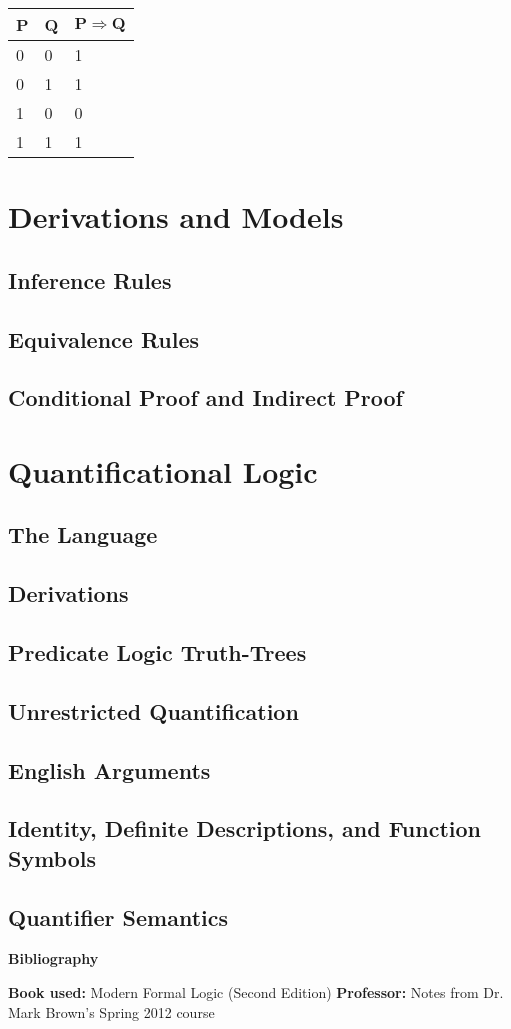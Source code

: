 \documentclass{report}
\begin{document}
\begin{itemize}
\begin{tabular}{ | l | l | p{1.25cm} |}
					\hline
					\textbf{P}& 
					\textbf{Q}&
					$\mathbf{P\Rightarrow Q}$\\
					\hline
		        	
		        	0& 
					0&
					1\\
					\hline
					
		        	0& 
					1&
					1\\
					\hline
					
		        	1& 
					0&
					0\\
					\hline
					
		        	1& 
					1&
					1\\
					\hline
				\end{tabular}
				\egroup
	\end{itemize}
\chapter{Derivations and Models}
	\section{Inference Rules}
	\section{Equivalence Rules}
	\section{Conditional Proof and Indirect Proof}
\chapter{Quantificational Logic}
	\section{The Language}
	\section{Derivations}
	\section{Predicate Logic Truth-Trees}
	\section{Unrestricted Quantification}
	\section{English Arguments}
	\section{Identity, Definite Descriptions, and Function Symbols}
	\section{Quantifier Semantics}

\newpage

\begin{center}
\textbf{\huge{Bibliography}}
\end{center}
\textbf{Book used:} Modern Formal Logic (Second Edition)\newline
\textbf{Professor:} Notes from Dr. Mark Brown's Spring 2012 course
\end{document}
